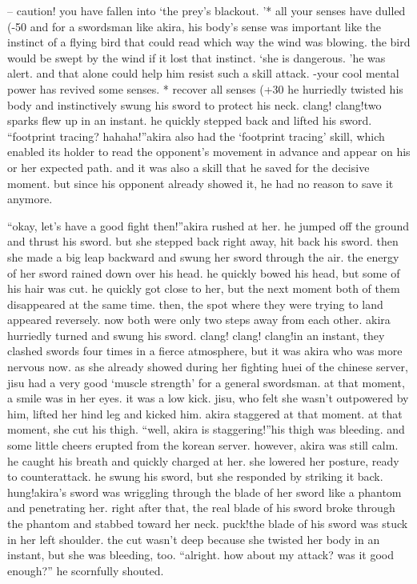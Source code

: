 – caution! you have fallen into ‘the prey’s blackout.
’* all your senses have dulled (-50%
and for a swordsman like akira, his body’s sense was important like the instinct of a flying bird that could read which way the wind was blowing.
 the bird would be swept by the wind if it lost that instinct.
‘she is dangerous.
’he was alert.
 and that alone could help him resist such a skill attack.
-your cool mental power has revived some senses.
* recover all senses (+30%
he hurriedly twisted his body and instinctively swung his sword to protect his neck.
clang! clang!two sparks flew up in an instant.
 he quickly stepped back and lifted his sword.
“footprint tracing? hahaha!”akira also had the ‘footprint tracing’ skill, which enabled its holder to read the opponent’s movement in advance and appear on his or her expected path.
 and it was also a skill that he saved for the decisive moment.
but since his opponent already showed it, he had no reason to save it anymore.


“okay, let’s have a good fight then!”akira rushed at her.
 he jumped off the ground and thrust his sword.
but she stepped back right away, hit back his sword.
 then she made a big leap backward and swung her sword through the air.
the energy of her sword rained down over his head.
 he quickly bowed his head, but some of his hair was cut.
 he quickly got close to her, but the next moment both of them disappeared at the same time.
 then, the spot where they were trying to land appeared reversely.
now both were only two steps away from each other.
akira hurriedly turned and swung his sword.
clang! clang! clang!in an instant, they clashed swords four times in a fierce atmosphere, but it was akira who was more nervous now.
as she already showed during her fighting huei of the chinese server, jisu had a very good ‘muscle strength’ for a general swordsman.
 at that moment, a smile was in her eyes.
it was a low kick.
 jisu, who felt she wasn’t outpowered by him, lifted her hind leg and kicked him.
akira staggered at that moment.
 at that moment, she cut his thigh.
“well, akira is staggering!”his thigh was bleeding.
 and some little cheers erupted from the korean server.
however, akira was still calm.
 he caught his breath and quickly charged at her.
she lowered her posture, ready to counterattack.
 he swung his sword, but she responded by striking it back.
hung!akira’s sword was wriggling through the blade of her sword like a phantom and penetrating her.
right after that, the real blade of his sword broke through the phantom and stabbed toward her neck.
puck!the blade of his sword was stuck in her left shoulder.
 the cut wasn’t deep because she twisted her body in an instant, but she was bleeding, too.
“alright.
 how about my attack? was it good enough?” he scornfully shouted.


 